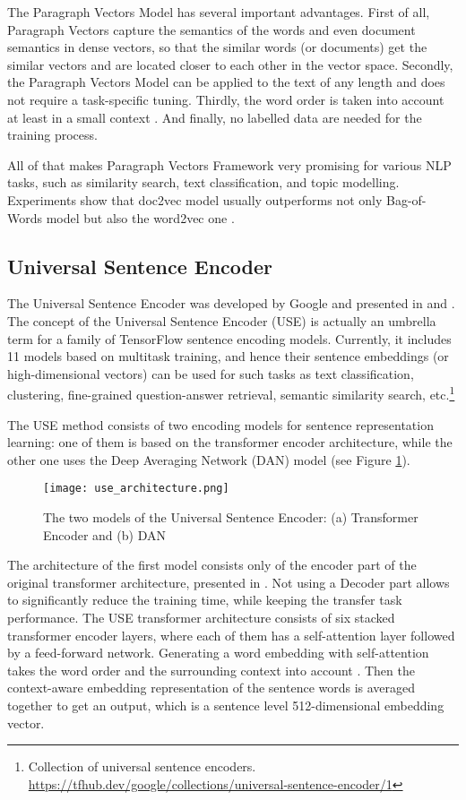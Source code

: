 \documentclass[fontsize=12pt,a4paper,twoside,openany]{scrbook}
\begin{document}
The Paragraph Vectors Model has several important advantages. First of all, Paragraph Vectors capture the semantics of the words and even document semantics in dense vectors, so that the similar words (or documents) get the similar vectors and are located closer to each other in the vector space. Secondly, the Paragraph Vectors Model can be applied to the text of any length and does not require a task-specific tuning. Thirdly, the word order is taken into account at least in a small context \parencite{Dai15}. And finally, no labelled data are needed for the training process. 

All of that makes Paragraph Vectors Framework very promising for various NLP tasks, such as similarity search, text classification, and topic modelling. Experiments show that doc2vec model usually outperforms not only Bag-of-Words model but also the word2vec one \parencite[see][]{Lau16, Le14}.

\subsection{Universal Sentence Encoder}
\label{sec:muse}

The Universal Sentence Encoder was developed by Google and presented in \parencite{Cer18a} and \parencite{Cer18b}. The concept of the Universal Sentence Encoder (USE) is actually an umbrella term for a family of TensorFlow sentence encoding models. Currently, it includes 11 models based on multitask training, and hence their sentence embeddings (or high-dimensional vectors) can be used for such tasks as text classification, clustering,  fine-grained question-answer retrieval, semantic similarity search, etc.\footnote{Collection of universal sentence encoders. \url{https://tfhub.dev/google/collections/universal-sentence-encoder/1}}

The USE method consists of two encoding models for sentence representation learning: one of them is based on the transformer encoder architecture, while the other one uses the Deep Averaging Network (DAN) model \parencite{Cer18a} (see Figure \ref{fig:use_architecture}).

\begin{figure}[h]
\centering
\texttt{[image: use\_architecture.png]}
\caption{The two models of the Universal Sentence Encoder: (a) Transformer Encoder and (b) DAN}
\label{fig:use_architecture}
\end{figure}

The architecture of the first model consists only of the encoder part of the original transformer architecture, presented in \parencite{Vaswani17}. Not using a Decoder part allows to significantly reduce the training time, while keeping the transfer task performance. The USE transformer architecture consists of six stacked transformer encoder layers, where each of them has a self-attention layer followed by a feed-forward network. Generating a word embedding with self-attention takes the word order and the surrounding context into account \parencite{Cer18a}. Then the context-aware embedding representation of the sentence words is averaged together to get an output, which is a sentence level 512-dimensional embedding vector. 
\end{document}

